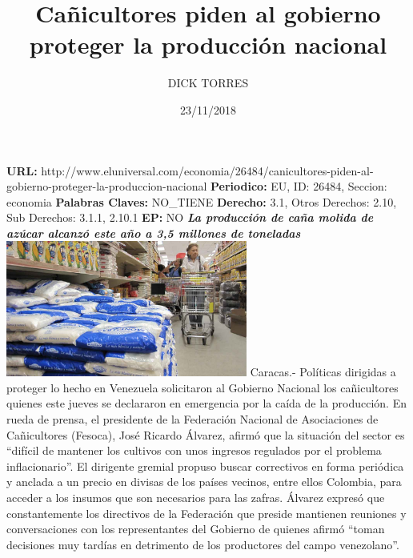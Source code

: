 \documentclass{article}%
\title{\textbf{Cañicultores piden al gobierno proteger la producción nacional}}%
\author{DICK TORRES}%
\date{23/11/2018}%
\begin{document}
%
\normalsize%
\maketitle%
\textbf{URL: }%
http://www.eluniversal.com/economia/26484/canicultores{-}piden{-}al{-}gobierno{-}proteger{-}la{-}produccion{-}nacional\newline%
%
\textbf{Periodico: }%
EU, %
ID: %
26484, %
Seccion: %
economia\newline%
%
\textbf{Palabras Claves: }%
NO\_TIENE\newline%
%
\textbf{Derecho: }%
3.1, %
Otros Derechos: %
2.10, %
Sub Derechos: %
3.1.1, 2.10.1\newline%
%
\textbf{EP: }%
NO\newline%
\newline%
%
\textbf{\textit{La producción de caña molida de azúcar alcanzó este año a 3,5 millones de toneladas}}%
\newline%
\newline%
%
\includegraphics[width=300px]{244.jpg}%
\newline%
%
Caracas.{-} Políticas dirigidas a proteger lo hecho en Venezuela solicitaron al Gobierno Nacional los cañicultores quienes este jueves se declararon en emergencia por la caída de la producción.%
\newline%
%
En rueda de prensa, el presidente de la Federación Nacional de Asociaciones de Cañicultores (Fesoca), José Ricardo Álvarez, afirmó que la situación del sector es “difícil de mantener los cultivos con unos ingresos regulados por el problema inflacionario”.%
\newline%
%
El dirigente gremial propuso buscar correctivos en forma periódica y anclada a un precio en divisas de los países vecinos, entre ellos Colombia, para acceder a los insumos que son necesarios para las zafras.%
\newline%
%
Álvarez expresó que constantemente los directivos de la Federación que preside mantienen reuniones y conversaciones con los representantes del Gobierno de quienes afirmó “toman decisiones muy tardías en detrimento de los productores del campo venezolano”.%
\end{document}
